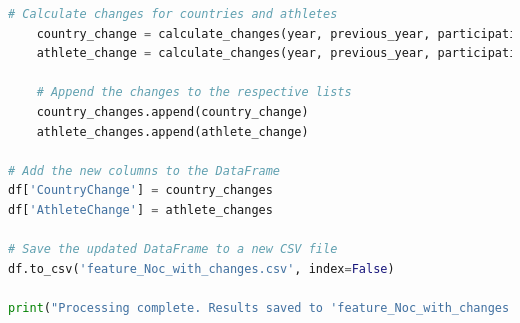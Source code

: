 \documentclass[12pt]{article}
\begin{document}
\begin{lstlisting}[language=Python, style=mystyle, caption=data\_analyze.ipynb]
    # Calculate changes for countries and athletes
    country_change = calculate_changes(year, previous_year, participating_countries[year], participating_countries)
    athlete_change = calculate_changes(year, previous_year, participating_athletes[year], participating_athletes)
    
    # Append the changes to the respective lists
    country_changes.append(country_change)
    athlete_changes.append(athlete_change)

# Add the new columns to the DataFrame
df['CountryChange'] = country_changes
df['AthleteChange'] = athlete_changes

# Save the updated DataFrame to a new CSV file
df.to_csv('feature_Noc_with_changes.csv', index=False)

print("Processing complete. Results saved to 'feature_Noc_with_changes.csv'")

\end{lstlisting}
\end{document}
